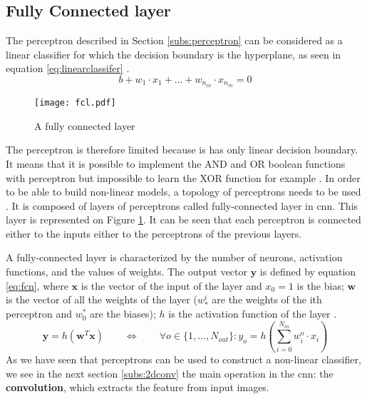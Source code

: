 \subsection{Fully Connected layer} \label{subs:fcl}
The perceptron described in Section \ref{subs:perceptron} can be considered as a linear classifier for which the decision boundary is the hyperplane, as seen in equation \eqref{eq:linearclassifer} \cite{matteucci_artificial_2019}.
%
\begin{equation}
    b + w_1 \cdot x_1 + ... + w_{n_{in}} \cdot x_{n_{in}} = 0
    \label{eq:linearclassifer}
\end{equation}
%
\begin{figure}
    \centering
    \texttt{[image: fcl.pdf]}
    \caption{A fully connected layer}
    \label{fig:fcn}
\end{figure}
%
The perceptron is therefore limited because is has only linear decision boundary. It means that it is possible to implement the AND and OR boolean functions with perceptron but impossible to learn the XOR function for example \cite{minsky_perceptrons_1972}. In order to be able to build non-linear models, a topology of perceptrons needs to be used \cite{khan_survey_2020}. It is composed of layers of perceptrons called fully-connected layer in \acrshort{cnn}. This layer is represented on Figure \ref{fig:fcn}. It can be seen that each perceptron is connected either to the inputs either to the perceptrons of the previous layers.

A fully-connected layer is characterized by the number of neurons, activation functions, and the values of weights. The output vector $\boldsymbol{y}$ is defined by equation \eqref{eq:fcn}, where $\boldsymbol{x}$ is the vector of the input of the layer and $x_0 = 1$ is the bias; $\boldsymbol{w}$ is the vector of all the weights of the layer ($w^i_*$ are the weights of the ith perceptron and $w^*_0$ are the biases); $h$ is the activation function of the layer \cite{abdelouahab_accelerating_2018}.
%
\begin{equation}
    \boldsymbol{y} = h(\boldsymbol{w}^T \boldsymbol{x}) \qquad \Leftrightarrow \qquad \forall o \in \{ 1, ..., N_{out} \} : y_o = h(\sum^{N_{in}}_{i=0} w^o_i \cdot x_i)
    \label{eq:fcn}
\end{equation}
%
As we have seen that perceptrons can be used to construct a non-linear classifier, we see in the next section \ref{subs:2dconv} the main operation in the \acrshort{cnn}: the \textbf{convolution}, which extracts the feature from input images.
